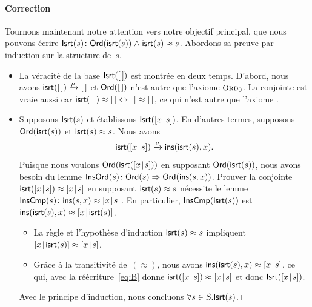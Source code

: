 \paragraph{Correction}

Tournons maintenant notre attention vers notre objectif principal, que
nous pouvons écrire \(\textsf{Isrt}({s})\colon \textsf{Ord}({\textsf{isrt}(s)})
\mathrel{\wedge} \textsf{isrt}(s) \approx
s\). Abordons sa preuve par induction sur
la structure de~\(s\).
\begin{itemize}

  \item La véracité de la base \(\textsf{Isrt}({[\,]})\) est montrée en deux
  temps. D'abord, nous avons \(\textsf{isrt}([\,])
  \xrightarrow{\smash{\mu}} [\,]\) et \(\textsf{Ord}({[\,]})\) n'est autre
  que l'axiome \(\TirName{Ord}_0\). La conjointe est vraie aussi car
  \(\textsf{isrt}([\,]) \approx [\,] \Leftrightarrow [\,] \approx [\,]\), ce
  qui n'est autre que l'axiome .

  \item Supposons \(\textsf{Isrt}({s})\) et établissons
  \(\textsf{Isrt}({[{x}\!\mid\!{s}]})\). En d'autres termes, supposons
  \(\textsf{Ord}({\textsf{isrt}(s)})\) et \(\textsf{isrt}(s) \approx s\). Nous
  avons
  \begin{equation}
    \textsf{isrt}([{x}\!\mid\!{s}]) \xrightarrow{\smash{\nu}}
    \textsf{ins}(\textsf{isrt}(s),x).\label{eq:B}
  \end{equation}
  Puisque nous voulons \(\textsf{Ord}({\textsf{isrt}([{x}\!\mid\!{s}])})\) en
  supposant \(\textsf{Ord}({\textsf{isrt}(s)})\), nous avons besoin du lemme
  \(\textsf{InsOrd}({s}) \colon \textsf{Ord}({s}) \Rightarrow
  \textsf{Ord}({\textsf{ins}(s,x)})\).
  Prouver la conjointe \(\textsf{isrt}([{x}\!\mid\!{s}]) \approx [{x}\!\mid\!{s}]\)
  en supposant \(\textsf{isrt}(s) \approx s\) nécessite le lemme
  \(\textsf{InsCmp}({s}) \colon \textsf{ins}(s,x) \approx [{x}\!\mid\!{s}]\). En
  particulier, \(\textsf{InsCmp}({\textsf{isrt}(s)})\) est
  \(\textsf{ins}(\textsf{isrt}(s),x) \approx [{x}\!\mid\!{\textsf{isrt}(s)}]\).
  \begin{itemize}

  \item La règle  et l'hypothèse d'induction
    \(\textsf{isrt}(s) \approx s\) impliquent \([{x}\!\mid\!{\textsf{isrt}(s)}]
    \approx [{x}\!\mid\!{s}]\).

  \item Grâce à la transitivité de~\((\approx)\), nous avons
    \(\textsf{ins}(\textsf{isrt}(s),x) \approx [{x}\!\mid\!{s}]\), ce qui, avec
    la réécriture~\eqref{eq:B} donne \(\textsf{isrt}([{x}\!\mid\!{s}]) \approx
    [{x}\!\mid\!{s}]\) et donc \(\textsf{Isrt}({[{x}\!\mid\!{s}]})\).

  \end{itemize}
  Avec le principe d'induction, nous concluons \(\forall s \in
  S.\textsf{Isrt}({s})\).\hfill\(\Box\)

\end{itemize}

